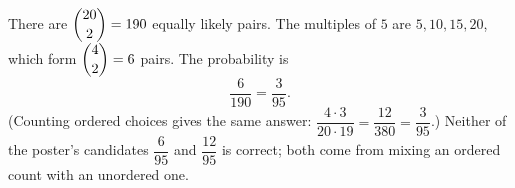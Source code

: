 There are $\dbinom{20}{2}=190$ equally likely pairs. The multiples of $5$ are $5,10,15,20$, which form $\dbinom42=6$ pairs. The probability is
\[
\dfrac{6}{190}=\boxed{\dfrac{3}{95}} .
\]
(Counting ordered choices gives the same answer: $\dfrac{4\cdot3}{20\cdot19}=\dfrac{12}{380}=\dfrac{3}{95}$.) Neither of the poster's candidates $\dfrac{6}{95}$ and $\dfrac{12}{95}$ is correct; both come from mixing an ordered count with an unordered one.
